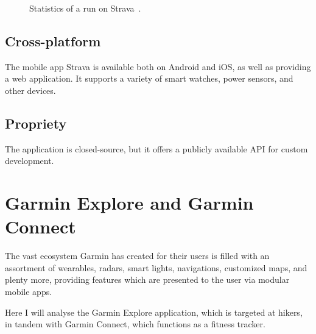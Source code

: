 \begin{figure}[h]
    \centering
    \caption{Statistics of a run on Strava~\cite{strava-run-stats-img}.}
    \label{strava-run-stats-img}
\end{figure}

\subsection*{Cross-platform}
The mobile app Strava is available both on Android and iOS, as well as providing a web application.
It supports a variety of smart watches, power sensors, and other devices.
\subsection*{Propriety}
The application is closed-source, but it offers a publicly available API for custom development.
\section{Garmin Explore and Garmin Connect}
The vast ecosystem Garmin has created for their users is filled with an assortment of wearables, radars, smart lights, navigations, customized maps, and plenty more, providing features which are presented to the user via modular mobile apps.

Here I will analyse the Garmin Explore application, which is targeted at hikers, in tandem with Garmin Connect, which functions as a fitness tracker.

